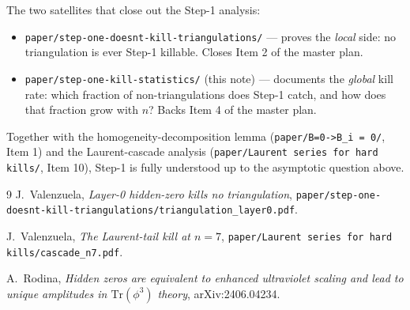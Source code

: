 \documentclass[11pt]{article}
\theoremstyle{definition}
\begin{document}
The two satellites that close out the Step-1 analysis:

\begin{itemize}[leftmargin=*,topsep=2pt,itemsep=4pt]
\item \verb|paper/step-one-doesnt-kill-triangulations/| --- proves the
       \emph{local} side: no triangulation is ever Step-1 killable.
       Closes Item 2 of the master plan.
\item \verb|paper/step-one-kill-statistics/| (this note) --- documents
       the \emph{global} kill rate: which fraction of non-triangulations
       does Step-1 catch, and how does that fraction grow with $n$?
       Backs Item 4 of the master plan.
\end{itemize}

Together with the homogeneity-decomposition lemma
(\verb|paper/B=0->B_i = 0/|, Item 1) and the Laurent-cascade analysis
(\verb|paper/Laurent series for hard kills/|, Item 10), Step-1 is
fully understood up to the asymptotic question above.

\begin{thebibliography}{9}
J.\ Valenzuela, \emph{Layer-0 hidden-zero kills no triangulation},
\verb|paper/step-one-doesnt-kill-triangulations/triangulation_layer0.pdf|.

J.\ Valenzuela, \emph{The Laurent-tail kill at $n=7$},
\verb|paper/Laurent series for hard kills/cascade_n7.pdf|.

A.\ Rodina, \emph{Hidden zeros are equivalent to enhanced ultraviolet
scaling and lead to unique amplitudes in $\mathrm{Tr}(\phi^3)$ theory},
arXiv:2406.04234.
\end{thebibliography}
\end{document}
